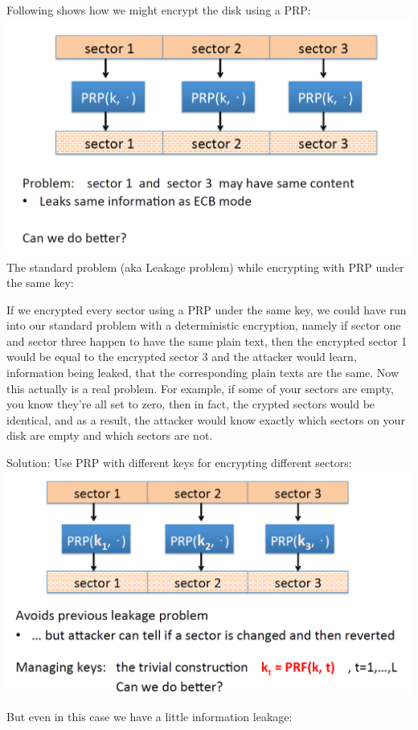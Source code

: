 \documentclass[11pt]{article}
\makeatletter
\def\maxwidth{\ifdim\Gin@nat@width>\linewidth\linewidth
    \else\Gin@nat@width\fi}
\let\Oldincludegraphics\includegraphics
\renewcommand{\includegraphics}[1]{\Oldincludegraphics[width=.8\maxwidth]{#1}}
\makeatother
\begin{document}
Following shows how we might encrypt the disk using a PRP:
\includegraphics{./Images/DiskEnc-PRP.png} The standard problem (aka
Leakage problem) while encrypting with PRP under the same key:

If we encrypted every sector using a PRP under the same key, we could
have run into our standard problem with a deterministic encryption,
namely if sector one and sector three happen to have the same plain
text, then the encrypted sector 1 would be equal to the encrypted sector
3 and the attacker would learn, information being leaked, that the
corresponding plain texts are the same. Now this actually is a real
problem. For example, if some of your sectors are empty, you know
they're all set to zero, then in fact, the crypted sectors would be
identical, and as a result, the attacker would know exactly which
sectors on your disk are empty and which sectors are not.

Solution: Use PRP with different keys for encrypting different sectors:
\includegraphics{./Images/DiskEnc-PRPdiffKeys.png}

But even in this case we have a little information leakage:
\end{document}
